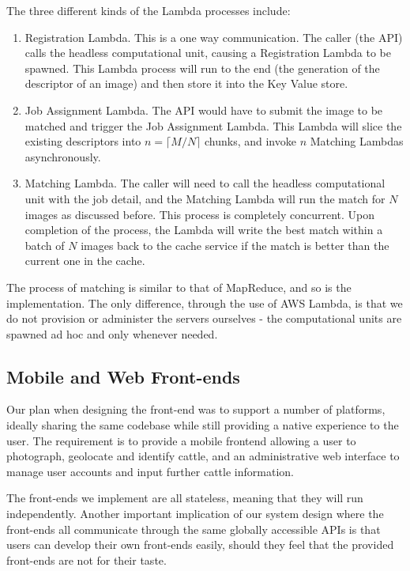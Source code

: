 The three different kinds of the Lambda processes include:

\begin{enumerate}
	\item Registration Lambda. This is a one way communication. The caller (the API) calls the headless computational unit, causing a Registration Lambda to be spawned. This Lambda process will run to the end (the generation of the descriptor of an image) and then store it into the Key Value store.
	\item Job Assignment Lambda. The API would have to submit the image to be matched and trigger the Job Assignment Lambda. This Lambda will slice the existing descriptors into $n=\lceil M / N \rceil$ chunks, and invoke $n$ Matching Lambdas asynchronously.
	\item Matching Lambda. The caller will need to call the headless computational unit with the job detail, and the Matching Lambda will run the match for $N$ images as discussed before. This process is completely concurrent. Upon completion of the process, the Lambda will write the best match within a batch of $N$ images back to the cache service if the match is better than the current one in the cache.
\end{enumerate}

The process of matching is similar to that of MapReduce, and so is the implementation. The only difference, through the use of AWS Lambda, is that we do not provision or administer the servers ourselves - the computational units are spawned ad hoc and only whenever needed.

\subsection{Mobile and Web Front-ends}

Our plan when designing the front-end was to support a number of platforms, ideally sharing the same codebase while still providing a native experience to the user. The requirement is to provide a mobile frontend allowing a user to photograph, geolocate and identify cattle, and an administrative web interface to manage user accounts and input further cattle information. 

The front-ends we implement are all stateless, meaning that they will run independently. Another important implication of our system design where the front-ends all communicate through the same globally accessible APIs is that users can develop their own front-ends easily, should they feel that the provided front-ends are not for their taste.

